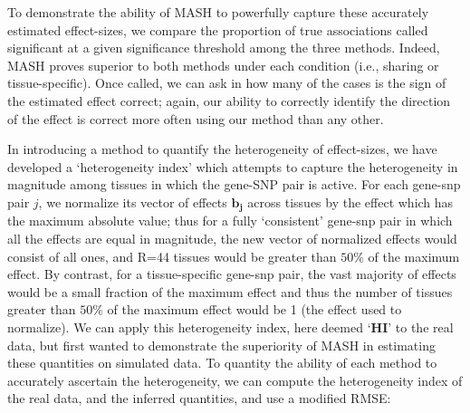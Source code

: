 To demonstrate the ability of MASH to powerfully capture these accurately estimated effect-sizes, we compare the proportion of true associations called significant at a given significance threshold among the three methods. Indeed, MASH proves superior to both methods under each condition (i.e., sharing or tissue-specific). Once called, we can ask in how many of the cases is the sign of the estimated effect correct; again, our ability to correctly identify the direction of the effect is correct more often using our method than any other.
%

In introducing a method to quantify the heterogeneity of effect-sizes, we have developed a `heterogeneity index' which attempts to capture the heterogeneity in magnitude among tissues in which the gene-SNP pair is active. For each gene-snp pair $j$, we normalize its vector of effects $\bm{b_{j}}$ across tissues by the effect which has the maximum absolute value; thus for a fully `consistent' gene-snp pair in which all the effects are equal in magnitude, the new vector of normalized effects would consist of all ones, and R=44 tissues would be greater than $50\%$ of the maximum effect. By contrast, for a tissue-specific gene-snp pair, the vast majority of effects would be a small fraction of the maximum effect and thus the number of tissues greater than $50\%$ of the maximum effect would be 1 (the effect used to normalize). We can apply this heterogeneity index, here deemed $\textbf{`HI'}$ to the real data, but first wanted to demonstrate the superiority of MASH in estimating these quantities on simulated data. To quantity the ability of each method to accurately ascertain the heterogeneity, we can compute the heterogeneity index of the real data, and the inferred quantities, and use a modified RMSE:


